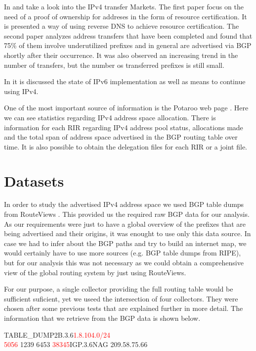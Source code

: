 \documentclass[11pt,a4paper]{scrreprt}
\begin{document}
In \cite{Land_Grab} and  \cite{IPv4_Transfer_Markets} take a look into the IPv4 transfer Markets. The first paper focus on the need of a proof of ownership for addreses in the form of resource certification. It is presented a way of using reverse DNS to achieve resource certification. The second paper analyzes address transfers that have been completed and found that 75\% of them involve underutilized prefixes and in general are advertised via BGP shortly after their occurrence. It was also observed an increasing trend in the number of transfers, but the number os transferred prefixes is still small.

In \cite{IPv6_state} it is discussed the state of IPv6 implementation as well as means to continue using IPv4.

One of the most important source of information is the Potaroo web page \cite{Potaroo}. 
Here we can see statistics regarding IPv4 address space allocation. There is information for each RIR regarding IPv4 address pool status, allocations made and the total span of address space advertised in the BGP routing table over time. It is also possible to obtain the delegation files for each RIR or a joint file.


\chapter{Datasets}

In order to study the advertised IPv4 address space we used BGP table dumps from RouteViews \cite{RouteViews}. This provided us the required raw BGP data for our analysis. As our requirements were just to have a global overview of the prefixes that are being advertised and their origins, it was enought to use only this data source. In case we had to infer about the BGP paths and try to build an internet map, we would certainly have to use more sources (e.g. BGP table dumps from RIPE), but for our analysis this was not necessary as we could obtain a comprehensive view of the global routing system by just using RouteViews.

For our purpose, a single collector providing the full routing table would be sufficient suficient, yet we useed the intersection of four collectors. They were chosen after some previous tests that are explained further in more detail.
The information that we retrieve from the BGP data is shown below. 
\vspace{5mm}

\hspace{1cm} TABLE\_DUMP2\textbar B.3.6\textbar \textcolor{red}{1.8.104.0/24}\textbar \\ \textcolor{red}{5056} 1239 6453 \textcolor{red}{38345}\textbar  IGP.3.6\textbar \textbar NAG 209.58.75.66\textbar
\end{document}
